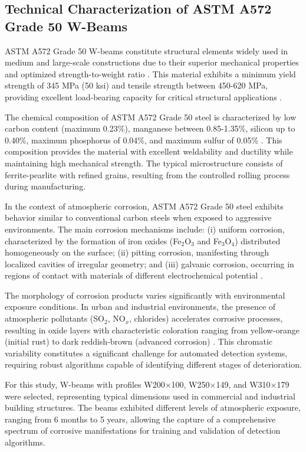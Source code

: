\documentclass[12pt,a4paper,twoside]{article}
\begin{document}
\subsection{Technical Characterization of ASTM A572 Grade 50 W-Beams}
\label{subsec:material_characterization}

ASTM A572 Grade 50 W-beams constitute structural elements widely used in medium and large-scale constructions due to their superior mechanical properties and optimized strength-to-weight ratio \cite{astm2018a572}. This material exhibits a minimum yield strength of 345 MPa (50 ksi) and tensile strength between 450-620 MPa, providing excellent load-bearing capacity for critical structural applications \cite{aisc2016specification}.

The chemical composition of ASTM A572 Grade 50 steel is characterized by low carbon content (maximum 0.23\%), manganese between 0.85-1.35\%, silicon up to 0.40\%, maximum phosphorus of 0.04\%, and maximum sulfur of 0.05\% \cite{astm2018a572}. This composition provides the material with excellent weldability and ductility while maintaining high mechanical strength. The typical microstructure consists of ferrite-pearlite with refined grains, resulting from the controlled rolling process during manufacturing.

In the context of atmospheric corrosion, ASTM A572 Grade 50 steel exhibits behavior similar to conventional carbon steels when exposed to aggressive environments. The main corrosion mechanisms include: (i) uniform corrosion, characterized by the formation of iron oxides (Fe$_2$O$_3$ and Fe$_3$O$_4$) distributed homogeneously on the surface; (ii) pitting corrosion, manifesting through localized cavities of irregular geometry; and (iii) galvanic corrosion, occurring in regions of contact with materials of different electrochemical potential \cite{ahmad2006principles}.

The morphology of corrosion products varies significantly with environmental exposure conditions. In urban and industrial environments, the presence of atmospheric pollutants (SO$_2$, NO$_x$, chlorides) accelerates corrosive processes, resulting in oxide layers with characteristic coloration ranging from yellow-orange (initial rust) to dark reddish-brown (advanced corrosion) \cite{melchers2018structural}. This chromatic variability constitutes a significant challenge for automated detection systems, requiring robust algorithms capable of identifying different stages of deterioration.

For this study, W-beams with profiles W200×100, W250×149, and W310×179 were selected, representing typical dimensions used in commercial and industrial building structures. The beams exhibited different levels of atmospheric exposure, ranging from 6 months to 5 years, allowing the capture of a comprehensive spectrum of corrosive manifestations for training and validation of detection algorithms.
\end{document}
